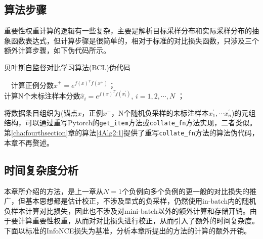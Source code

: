 \subsection{算法步骤}
重要性权重计算的逻辑有一些复杂，主要是解析目标采样分布和实际采样分布的抽象函数表达式，但计算步骤是很简单的，相对于标准的对比损失函数，只涉及三个额外计算步骤，如下伪代码所示。
\begin{algorithm}[!]
	\small
	\caption{贝叶斯自监督对比学习算法(BCL)伪代码}\label{5-Alg:1}
	~~计算正例分数$\hat{x}^+ = e^{f(x)^Tf(x^+)}$；\\
	计算N个未标注样本分数$\hat{x}_i = e^{f(x)^Tf(x^\prime_i)}$, $i = 1,2,\cdots, N$ ；\\
\end{algorithm}

将数据条目组织为(锚点$x$，正例$x^+$，N个随机负采样的未标注样本$x_1^\prime, \cdots x_n^\prime$)的元组结构，可以通过重写Pytorch的\verb|get_item|方法或\verb|collate_fn|方法实现，二者类似。第\ref{cha:fourthsection}章的算法\ref{4Alg2:1}提供了重写\verb|collate_fn|方法的算法伪代码，本章不再赘述。

\subsection{时间复杂度分析}
本章所介绍的方法，是上一章从$N=1$个负例向多个负例的更一般的对比损失的推广，但基本思想都是估计校正，不涉及显式的负采样，仍然使用in-batch内的随机负样本计算对比损失，因此也不涉及对mini-batch以外的额外计算和存储开销。由于要计算重要性权重，从而对对比损失进行校正，从而引入了额外的时间复杂度。下面以标准的InfoNCE损失为基准，分析本章所提出的方法的计算的额外开销。

